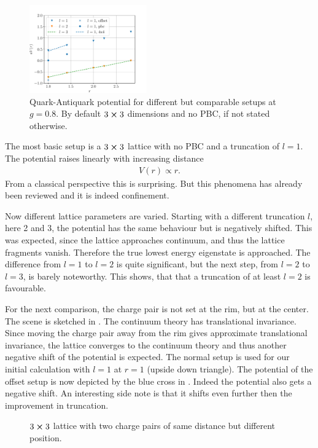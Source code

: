 \begin{figure}[h]
	\begin{center}
		\includegraphics[width=0.45\textwidth]{images/quark_antiquark_potential_normal_g_corr.pdf}
	\end{center}
	\caption{Quark-Antiquark potential for different but comparable setups at $g=\num{0.8}$. By default $3\cross3$ dimensions and no PBC, if not stated otherwise.}\label{fig:qqbarscorr}
\end{figure}
The most basic setup is a $3\cross 3$ lattice with no PBC and a truncation of $l=1$. The potential raises linearly with increasing distance
\begin{align}
	V(r) \propto r.
\end{align}
From a classical perspective this is surprising. But this phenomena has already been reviewed \cite{RevModPhys.51.659} and it is indeed confinement.

Now different lattice parameters are varied.
Starting with a different truncation $l$, here 2 and 3, the potential has the same behaviour but is negatively shifted. This was expected, since the lattice approaches continuum, and thus the lattice fragments vanish. Therefore the true lowest energy eigenstate is approached. The difference from $l=1$ to $l=2$ is quite significant, but the next step, from $l=2$ to $l=3$, is barely noteworthy. This shows, that that a truncation of at least $l=2$ is favourable.

For the next comparison, the charge pair is not set at the rim, but at the center. The scene is sketched in . The continuum theory has translational invariance. Since moving the charge pair away from the rim gives approximate translational invariance, the lattice converges to the continuum theory and thus another negative shift of the potential is expected. The normal setup is used for our initial calculation with $l=1$ at $r=1$ (upside down triangle). The potential of the offset setup is now depicted by the blue cross in . Indeed the potential also gets a negative shift. An interesting side note is that it shifts even further then the improvement in truncation.
\begin{figure}[h]
	\begin{center}
		
		\caption{$3\cross 3$ lattice with two charge pairs of same distance but different position.}\label{fig:3x3no}
	\end{center}
\end{figure}

